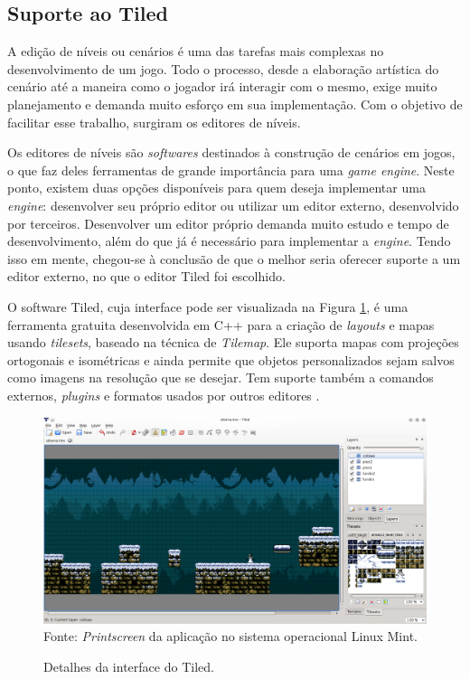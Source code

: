 \subsection{Suporte ao Tiled}
%
A edição de níveis ou cenários é uma das tarefas mais complexas no desenvolvimento de um jogo. Todo o processo, desde a elaboração artística do cenário até a maneira como o jogador irá interagir com o mesmo, exige muito planejamento e demanda muito esforço em sua implementação. Com o objetivo de facilitar esse trabalho, surgiram os editores de níveis. 
\par
Os editores de níveis são \textit{softwares} destinados à construção de cenários em jogos, o que faz deles ferramentas de grande importância para uma \textit{game engine}. Neste ponto, existem duas opções disponíveis para quem deseja implementar uma \textit{engine}: desenvolver seu próprio editor ou utilizar um editor externo, desenvolvido por terceiros. Desenvolver um editor próprio demanda muito estudo e tempo de desenvolvimento, além do que já é necessário para implementar a \textit{engine}. Tendo isso em mente, chegou-se à conclusão de que o melhor seria oferecer suporte a um editor externo, no que o editor Tiled foi escolhido. 
\par
O software Tiled, cuja interface pode ser visualizada na Figura \ref{tiledGUI}, é uma ferramenta gratuita desenvolvida em C++ para a criação de \textit{layouts} e mapas usando \textit{tilesets}, baseado na técnica de \textit{Tilemap}. Ele suporta mapas com projeções ortogonais e isométricas e ainda permite que objetos personalizados sejam salvos como imagens na resolução que se desejar. Tem suporte também a comandos externos, \textit{plugins} e formatos usados por outros editores \cite{SiteTiled}.
%
\begin{figure}[H]
    \centering
     \caption{Detalhes da interface do Tiled.}
    \label{tiledGUI}
    \includegraphics[scale = 0.45]{Imagens/Tiled.png}
    \\Fonte: \textit{Printscreen} da aplicação no sistema operacional Linux Mint.
\end{figure}
